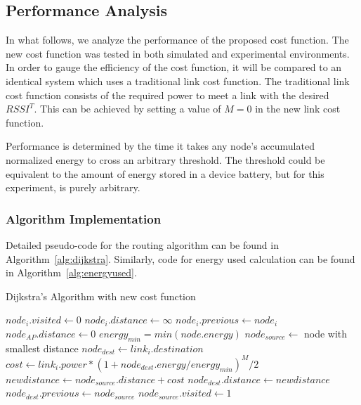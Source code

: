 \documentclass{article}
\begin{document}
\subsection{Performance Analysis}
In what follows, we analyze the performance of the proposed cost function. The new cost function was tested in both simulated and experimental environments. In order to gauge the efficiency of the cost function, it will be compared to an identical system which uses a traditional link cost function. The traditional link cost function consists of the required power to meet a link with the desired $RSSI^T$. This can be achieved by setting a value of $M=0$ in the new link cost function.

Performance is determined by the time it takes any node's accumulated normalized energy to cross an arbitrary threshold. The threshold could be equivalent to the amount of energy stored in a device battery, but for this experiment, is purely arbitrary. 

\subsubsection{Algorithm Implementation}
Detailed pseudo-code for the routing algorithm can be found in Algorithm~\ref{alg:dijkstra}. Similarly, code for energy used calculation can be found in Algorithm~\ref{alg:energyused}.

\begin{algorithm}[!ht]
\caption{Dijkstra's Algorithm with new cost function}
\label{alg:dijkstra}
\begin{algorithmic}[1]
	\STATE $node_i.visited \leftarrow 0$
	\STATE $node_i.distance \leftarrow \infty$
	\STATE $node_i.previous \leftarrow node_i$
\ENDFOR
\STATE $node_{AP}.distance \leftarrow 0$
\STATE $energy_{min} = min(node.energy)$
	\STATE $node_{source} \leftarrow $ node with smallest distance
			\STATE $node_{dest} \leftarrow link_i.destination$
				\STATE $cost \leftarrow link_i.power * (1 + node_{dest}.energy/energy_{min} )^M/2$
				\STATE $newdistance \leftarrow node_{source}.distance + cost$
				\STATE$node_{dest}.distance \leftarrow newdistance$
				\STATE$node_{dest}.previous \leftarrow node_{source}$
				\ENDIF
			\ENDIF
		\ENDIF
	\ENDFOR
	\STATE $node_{source}.visited \leftarrow 1$
\ENDWHILE
\end{algorithmic}
\end{algorithm}
\end{document}

